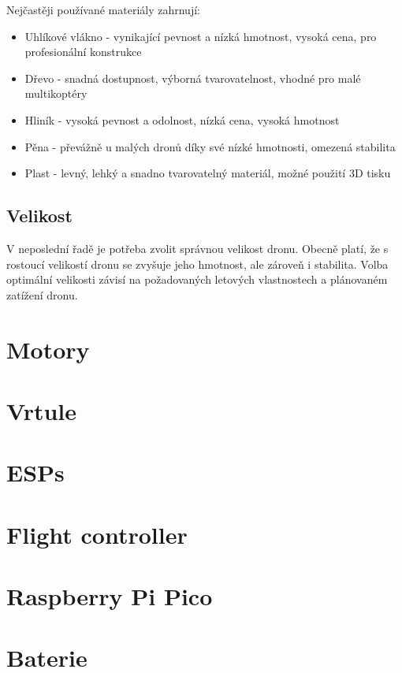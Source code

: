 \documentclass[12pt]{report}
\begin{document}
Nejčastěji používané materiály zahrnují:
\begin{itemize}
	\item Uhlíkové vlákno - vynikající pevnost a nízká hmotnost, vysoká cena, pro profesionální konstrukce
	\item Dřevo - snadná dostupnost, výborná tvarovatelnost, vhodné pro malé multikoptéry
	\item Hliník - vysoká pevnost a odolnost, nízká cena, vysoká hmotnost
	\item Pěna - převážně u malých dronů díky své nízké hmotnosti, omezená stabilita
	\item Plast - levný, lehký a snadno tvarovatelný materiál, možné použití 3D tisku
\end{itemize}

\subsection{Velikost}
V neposlední řadě je potřeba zvolit správnou velikost dronu.  Obecně platí, že s rostoucí velikostí dronu se zvyšuje jeho hmotnost, ale zároveň i stabilita. Volba optimální velikosti závisí na požadovaných letových vlastnostech a plánovaném zatížení dronu.

\section{Motory}
\lipsum[1]

\section{Vrtule}

\lipsum[1]

\section{ESPs}

\lipsum[2]

\section{Flight controller}
\lipsum[3]

\section{Raspberry Pi Pico}


\section{Baterie}
\end{document}
